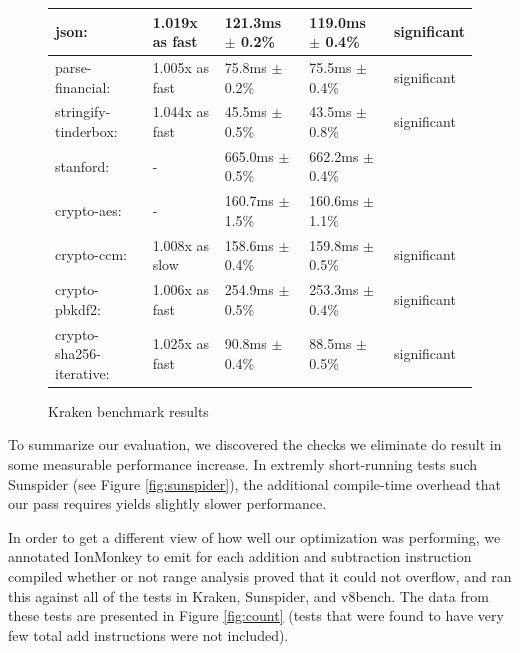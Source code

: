 \documentclass{article}
\begin{document}
\begin{figure}[H]
\begin{tabular}{|l|l|l|l|l|}
\hline\hline
      json:                     & 1.019x as fast   &  121.3ms $\pm$ 0.2\% &   119.0ms $\pm$ 0.4\%  &   significant\\
\hline\hspace{0.5em} parse-financial:        & 1.005x as fast   &   75.8ms $\pm$ 0.2\% &    75.5ms $\pm$ 0.4\%  &   significant\\
\hline\hspace{0.5em} stringify-tinderbox:    & 1.044x as fast   &   45.5ms $\pm$ 0.5\% &    43.5ms $\pm$ 0.8\%  &   significant\\
\hline\hline
      stanford:                 & -                &  665.0ms $\pm$ 0.5\% &   662.2ms $\pm$ 0.4\%  &\\
\hline\hspace{0.5em} crypto-aes:             & -                &  160.7ms $\pm$ 1.5\% &   160.6ms $\pm$ 1.1\%  &\\
\hline\hspace{0.5em} crypto-ccm:             & 1.008x as slow &  158.6ms $\pm$ 0.4\% &   159.8ms $\pm$ 0.5\%  &   significant\\
\hline\hspace{0.5em} crypto-pbkdf2:          & 1.006x as fast   &  254.9ms $\pm$ 0.5\% &   253.3ms $\pm$ 0.4\%  &   significant\\
\hline\hspace{0.5em} crypto-sha256-iterative:& 1.025x as fast   &   90.8ms $\pm$ 0.4\% &    88.5ms $\pm$ 0.5\%  &   significant \\
\hline
\end{tabular}
\caption{Kraken benchmark results}
\label{fig:kraken}
\end{figure}

To summarize our evaluation, we discovered the checks we eliminate do result in
some measurable performance increase. In extremly short-running tests such
Sunspider (see Figure \ref{fig:sunspider}), the additional compile-time
overhead that our pass requires yields slightly slower performance.


In order to get a different view of how well our optimization was
performing, we annotated IonMonkey to emit for each addition and subtraction
instruction compiled whether or not range analysis proved that it
could not overflow, and ran this against all of the tests in Kraken,
Sunspider, and v8bench. The data from these tests are presented in Figure
\ref{fig:count} (tests that were found to have very few total add
instructions were not included).
\end{document}
